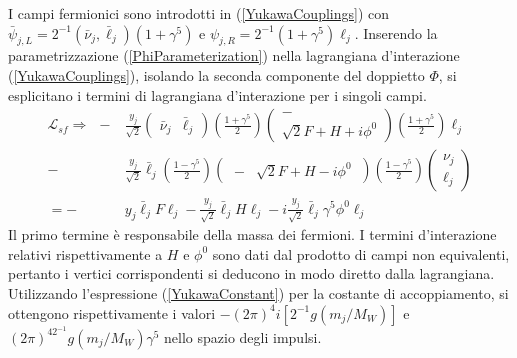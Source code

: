 \documentclass[11pt]{article}
\begin{document}
    I campi fermionici sono introdotti in (\ref{YukawaCouplings}) con $\bar{\psi}_{j,L}=2^{-1}\left(\bar{\nu}_j,\bar{\ell}_j\right)(1+\gamma^5)$ e $\psi_{j,R}=2^{-1}(1+\gamma^5)\ell_{j}$.
    Inserendo la parametrizzazione (\ref{PhiParameterization}) nella lagrangiana d'interazione (\ref{YukawaCouplings}), isolando la seconda componente del doppietto $\Phi$,
    si esplicitano i termini di lagrangiana d'interazione per i singoli campi.
    \begin{equation}
    \begin{split}
    \mathcal{L}_{sf}\Longrightarrow\ \ -&\frac{y_j}{\sqrt{2}}\begin{pmatrix}\bar{\nu}_{j} & \bar{\ell}_{j}\end{pmatrix}\left(\frac{1+\gamma^5}{2}\right)\begin{pmatrix}-\\ \sqrt{2}F+H+i\phi^0\end{pmatrix}\left(\frac{1+\gamma^5}{2}\right)\ell_j\\
    -&\frac{y_j}{\sqrt{2}}\bar{\ell}_j\left(\frac{1-\gamma^5}{2}\right)\begin{pmatrix} \ - &\sqrt{2}F+H-i\phi^0\ \end{pmatrix}\left(\frac{1-\gamma^5}{2}\right)\begin{pmatrix} \nu_j\\ \ell_j \end{pmatrix}\\
    =-&y_j\bar{\ell}_jF\ell_j-\frac{y_j}{\sqrt{2}}\bar{\ell}_j H \ell_j-i\frac{y_j}{\sqrt{2}}\bar{\ell}_j \gamma^5\phi^0 \ell_j
    \end{split}
    \end{equation}
    Il primo termine è responsabile della massa dei fermioni. I termini d'interazione relativi rispettivamente a $H$ e $\phi^0$ sono dati dal prodotto di campi non equivalenti, pertanto i vertici corrispondenti si deducono in modo diretto dalla lagrangiana.
    Utilizzando l'espressione (\ref{YukawaConstant}) per la costante di accoppiamento, si ottengono rispettivamente i valori $-(2\pi)^4i[2^{-1}g(m_j/M_W)]$ e $(2\pi)^42^{-1}g(m_j/M_W)\gamma^5$ nello spazio degli impulsi.
\end{document}
